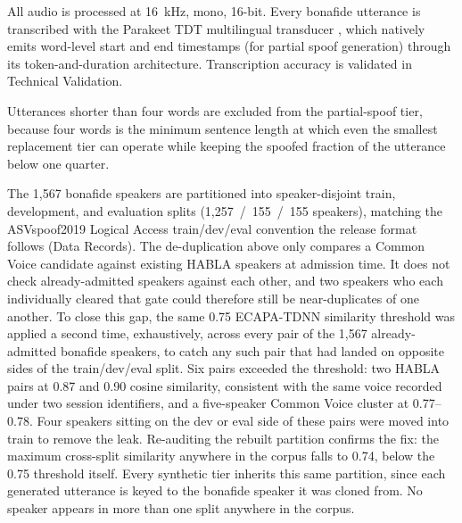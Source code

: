 \documentclass[11pt]{article}
\begin{document}
All audio is processed at \SI{16}{\kilo\hertz}, mono, 16-bit. Every bonafide utterance is transcribed with the Parakeet TDT multilingual transducer \citep{tdt,parakeet}, which natively emits word-level start and end timestamps (for partial spoof generation) through its token-and-duration architecture. Transcription accuracy is validated in Technical Validation.


Utterances shorter than four words are excluded from the partial-spoof tier, because four words is the minimum sentence length at which even the smallest replacement tier can operate while keeping the spoofed fraction of the utterance below one quarter.

The 1{,}567 bonafide speakers are partitioned into speaker-disjoint
train, development, and evaluation splits (1{,}257~/~155~/~155
speakers), matching the ASVspoof2019 Logical Access train/dev/eval
convention the release format follows (Data Records). The
de-duplication above only compares a Common Voice candidate against
existing HABLA speakers at admission time. It does not check
already-admitted speakers against each other, and two speakers who
each individually cleared that gate could therefore still be
near-duplicates of one another. To close this gap, the same 0.75 ECAPA-TDNN similarity
threshold was applied a second time, exhaustively, across every pair
of the 1{,}567 already-admitted bonafide speakers, to catch any such
pair that had landed on opposite sides of the train/dev/eval split.
Six pairs exceeded the threshold: two HABLA pairs at 0.87 and 0.90
cosine similarity, consistent with the same voice recorded under two
session identifiers, and a five-speaker Common Voice cluster at
0.77--0.78. Four speakers sitting on the dev or eval side of these
pairs were moved into train to remove the leak. Re-auditing the
rebuilt partition confirms the fix: the maximum cross-split similarity
anywhere in the corpus falls to 0.74, below the 0.75 threshold itself.
Every synthetic tier inherits this same partition, since each generated
utterance is keyed to the bonafide speaker it was cloned from. No
speaker appears in more than one split anywhere in the corpus.
\end{document}
